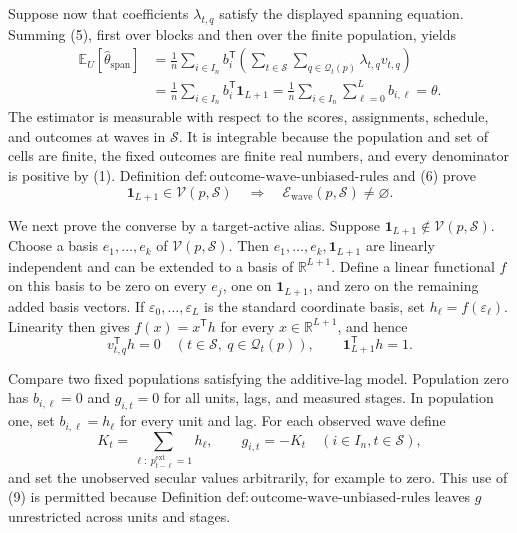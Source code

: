 Suppose now that coefficients \(\lambda_{t,q}\) satisfy the displayed spanning equation.  Summing (5), first over blocks and then over the finite population, yields
\[
 \begin{aligned}
 \mathbb E_U[\widehat\theta_{\mathrm{span}}]
 &=\frac1n\sum_{i\in I_n}
   b_i^{\mathsf T}
   \left(\sum_{t\in\mathcal S}\sum_{q\in\mathcal Q_t(p)}
          \lambda_{t,q}v_{t,q}\right)\\
 &=\frac1n\sum_{i\in I_n}b_i^{\mathsf T}\mathbf 1_{L+1}
 =\frac1n\sum_{i\in I_n}\sum_{\ell=0}^{L}b_{i,\ell}
 =\theta.
 \end{aligned}
\tag{6}
\]
The estimator is measurable with respect to the scores, assignments, schedule, and outcomes at waves in \(\mathcal S\).  It is integrable because the population and set of cells are finite, the fixed outcomes are finite real numbers, and every denominator is positive by (1).  Definition \(\mathrm{def:outcome\text{-}wave\text{-}unbiased\text{-}rules}\) and (6) prove
\[
 \mathbf 1_{L+1}\in\mathcal V(p,\mathcal S)
 \quad\Longrightarrow\quad
 \mathcal E_{\mathrm{wave}}(p,\mathcal S)\ne\varnothing.
\tag{7}
\]

We next prove the converse by a target-active alias.  Suppose \(\mathbf 1_{L+1}\notin\mathcal V(p,\mathcal S)\).  Choose a basis \(e_1,\ldots,e_k\) of \(\mathcal V(p,\mathcal S)\).  Then \(e_1,\ldots,e_k,\mathbf 1_{L+1}\) are linearly independent and can be extended to a basis of \(\mathbb R^{L+1}\).  Define a linear functional \(f\) on this basis to be zero on every \(e_j\), one on \(\mathbf 1_{L+1}\), and zero on the remaining added basis vectors.  If \(\varepsilon_0,\ldots,\varepsilon_L\) is the standard coordinate basis, set \(h_\ell=f(\varepsilon_\ell)\).  Linearity then gives \(f(x)=x^{\mathsf T}h\) for every \(x\in\mathbb R^{L+1}\), and hence
\[
 v_{t,q}^{\mathsf T}h=0
 \quad(t\in\mathcal S,\ q\in\mathcal Q_t(p)),
 \qquad
 \mathbf 1_{L+1}^{\mathsf T}h=1.
\tag{8}
\]

Compare two fixed populations satisfying the additive-lag model.  Population zero has \(b_{i,\ell}=0\) and \(g_{i,t}=0\) for all units, lags, and measured stages.  In population one, set \(b_{i,\ell}=h_\ell\) for every unit and lag.  For each observed wave define
\[
 K_t=\sum_{\ell:\ p^{\mathrm{ext}}_{t-\ell}=1}h_\ell,
 \qquad g_{i,t}=-K_t\quad(i\in I_n,t\in\mathcal S),
\tag{9}
\]
and set the unobserved secular values arbitrarily, for example to zero.  This use of (9) is permitted because Definition \(\mathrm{def:outcome\text{-}wave\text{-}unbiased\text{-}rules}\) leaves \(g\) unrestricted across units and stages.

